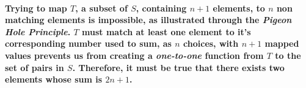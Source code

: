 \documentclass{amsart}
\theoremstyle{definition}
\theoremstyle{remark}
\numberwithin{equation}{section}
\begin{document}
\paragraph{
	Trying to map $T$, a subset of $S$, containing $n+1$ elements, to $n$ non matching elements is impossible, as illustrated through the \textit{Pigeon Hole Principle}. $T$ must match at least one element to it's corresponding number used to sum, as $n$ choices, with $n+1$ mapped values prevents us from creating a \textit{one-to-one} function from $T$ to the set of pairs in $S$. Therefore, it must be true that there exists two elements whose sum is $2n+1$.
}
\end{document}
